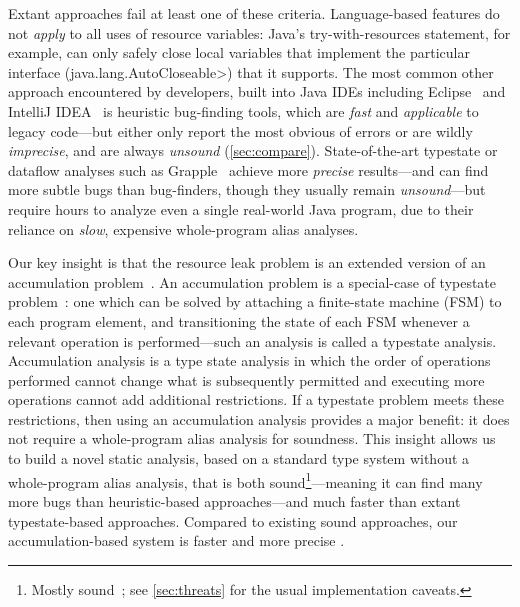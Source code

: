 Extant approaches fail at least one of these criteria.
Language-based features do not \emph{apply} to all uses of resource variables:
Java's try-with-resources statement, for example, can
only safely close local variables that implement the particular
interface (\<java.lang.AutoCloseable>) that it supports.
The most common other
approach encountered by developers, built into Java IDEs including
Eclipse~\cite{ecj-resource-leak} and IntelliJ
IDEA~\cite{idea-resource-leak} is heuristic bug-finding tools, which
are \emph{fast} and \emph{applicable} to legacy
code---but either only report the most obvious of
errors or are wildly \emph{imprecise}, and are
always \emph{unsound} (\cref{sec:compare}).
State-of-the-art typestate or dataflow analyses such as
Grapple~\cite{zuo2019grapple} achieve more \emph{precise} results---and
can find more subtle bugs than bug-finders, though they usually remain
\emph{unsound}---but
require hours to analyze even a single real-world Java program, due
to their reliance on \emph{slow}, expensive whole-program alias analyses.

Our key insight is that the resource leak problem is an extended
version of an accumulation problem~\cite{KelloggRSSE2020}. An
accumulation problem is a special-case of typestate problem~\cite{StromY86}:
one which can be solved by attaching a finite-state machine (FSM)
to each program element, and transitioning the state of each
FSM whenever a relevant operation is performed---such an analysis
is called a typestate analysis.
Accumulation analysis is a type state analysis in which
the order of operations performed cannot change what is subsequently
permitted and executing more operations cannot add additional
restrictions.  If a typestate problem meets these restrictions, then
using an accumulation analysis provides a major benefit: it does not
require a whole-program alias analysis for soundness.
This insight allows
us to build a novel static analysis, based on a standard type system
without a whole-program alias analysis, that is both sound\footnote{Mostly
  sound~\cite{livshits2015defense}; see
\cref{sec:threats} for the usual implementation caveats.}---meaning it
can find many more bugs than heuristic-based approaches---and much
faster than extant typestate-based approaches.  Compared to existing
sound approaches, our accumulation-based system is faster and more
precise .

